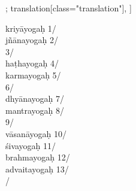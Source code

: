 \documentclass[12pt]{article}%
\def\om{\textrm{\footnotesize \textit{omitted in}\ }} %
\begin{document}
\begin{alignment}[
    texts=edition[class="edition"];
    translation[class="translation"],
    ]
    \begin{edition}
%
     \begin{prose}kriyāyogaḥ 1/\\ jñānayogaḥ 2/\\  3/\\ haṭhayogaḥ 4/\\ karmayogaḥ 5/\\  6/\\ dhyānayogaḥ 7/\\ mantrayogaḥ 8/\\  9/\\ vāsanāyogaḥ 10/\\ śivayogaḥ 11/\\ brahmayogaḥ 12/\\ advaitayogaḥ 13/\\ /\\ \\

\end{prose}
\end{edition}
\end{alignment}
\end{document}
